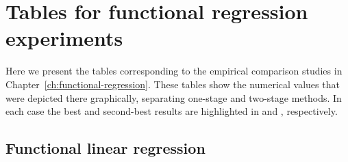 \chapter{Tables for functional regression experiments}\label{app:tables-bfr}

Here we present the tables corresponding to the empirical comparison studies in Chapter~\ref{ch:functional-regression}. These tables show the numerical values that were depicted there graphically, separating one-stage and two-stage methods. In each case the best and second-best results are highlighted in  and , respectively.

\section{Functional linear regression}

